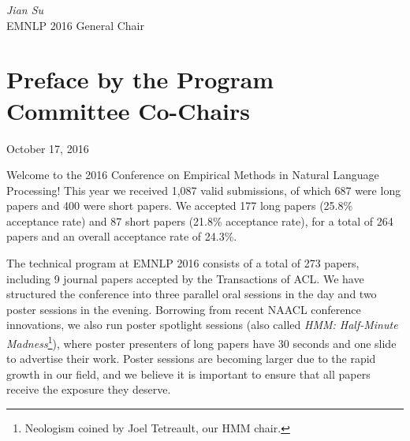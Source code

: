 \begin{flushright}
\emph{Jian Su}\\
 EMNLP 2016 General Chair 
\par\end{flushright}

\newpage{}


\section{Preface by the Program Committee Co-Chairs}


\vskip 1cm
\hfill October 17, 2016
\vskip 1cm

Welcome to the 2016 Conference on Empirical Methods in Natural Language Processing!
This year we received 1,087 valid submissions, of which 687 were long
papers and 400 were short papers.
We accepted 177 long papers (25.8\% acceptance rate) and 
87 short papers (21.8\% acceptance rate), for a total of 
264 papers and an overall acceptance rate of 24.3\%.

The technical program at EMNLP 2016 consists of a total of 273 papers, including 9 journal papers accepted by the Transactions of ACL. 
We have structured the conference into three parallel oral sessions in the day and two poster sessions in the evening. 
%
Borrowing from
recent NAACL conference innovations, we also run poster spotlight sessions (also called \emph{HMM: Half-Minute Madness}\footnote{Neologism coined by Joel Tetreault, our HMM chair.}), where poster presenters of long papers have 30 seconds and one slide to advertise their work. Poster sessions are becoming larger due to the rapid growth in our field, and we believe it 
is important to ensure that all papers receive the exposure they deserve. 

